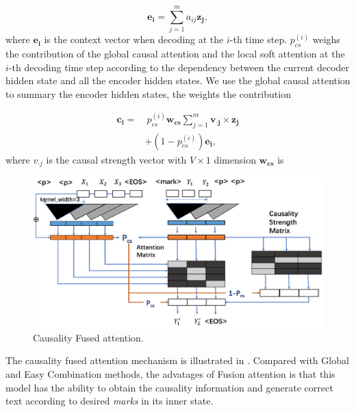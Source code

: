 \begin{equation}
\mathbf{e_i} = \sum_{j=1}^{m}a_{ij}\mathbf{z_j},
\end{equation}
where $\mathbf{e_i}$ is the context vector when decoding at the $i$-th time step. 
$p^{(i)}_{cs}$ weighs the contribution of the global causal attention and the local soft attention at the $i$-th decoding time step according to the dependency between the current decoder hidden state and all the encoder hidden states.
We use the global causal attention to summary the
encoder hidden states, the weights the contribution 


\begin{equation}
\begin{split}
\mathbf{c_i} = & ~p^{(i)}_{cs}\mathbf{w_{cs}}\sum_{j=1}^{m}\mathbf{v_{\boldsymbol{\cdot} j}} \times \mathbf{z_j} \\
& + (1-p^{(i)}_{cs})\mathbf{e_i},
\end{split}
\end{equation}
where $v_{\cdot j}$ is the causal strength vector with $V \times 1$ dimension  $\mathbf{w_{cs}}$ is 
\begin{figure}[th]
    \centering
    \includegraphics[width=1.8\columnwidth]{fusedatt}
    \caption{Causality Fused attention. }
    \label{fig:fusedatt}
\end{figure}
The causality fused attention mechanism is illustrated in .
Compared with Global and Easy Combination methods, the advatages
of Fusion attention is that this model has the ability to 
obtain the causality information and generate correct text according
to desired \textit{marks} in its inner state.



